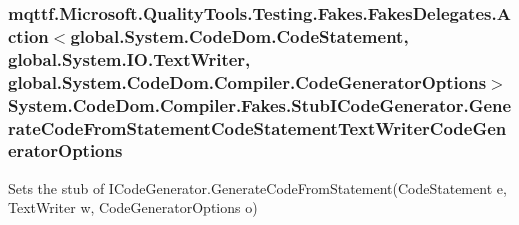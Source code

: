 \hypertarget{class_system_1_1_code_dom_1_1_compiler_1_1_fakes_1_1_stub_i_code_generator_a871d5b7c61f29c1e5b96d8c6b92cbf01}{
\subsubsection[{Generate\-Code\-From\-Statement\-Code\-Statement\-Text\-Writer\-Code\-Generator\-Options}]{\setlength{\rightskip}{0pt plus 5cm}mqttf.\-Microsoft.\-Quality\-Tools.\-Testing.\-Fakes.\-Fakes\-Delegates.\-Action$<$global.\-System.\-Code\-Dom.\-Code\-Statement, global.\-System.\-I\-O.\-Text\-Writer, global.\-System.\-Code\-Dom.\-Compiler.\-Code\-Generator\-Options$>$ System.\-Code\-Dom.\-Compiler.\-Fakes.\-Stub\-I\-Code\-Generator.\-Generate\-Code\-From\-Statement\-Code\-Statement\-Text\-Writer\-Code\-Generator\-Options}}\label{class_system_1_1_code_dom_1_1_compiler_1_1_fakes_1_1_stub_i_code_generator_a871d5b7c61f29c1e5b96d8c6b92cbf01}


Sets the stub of I\-Code\-Generator.\-Generate\-Code\-From\-Statement(\-Code\-Statement e, Text\-Writer w, Code\-Generator\-Options o)

